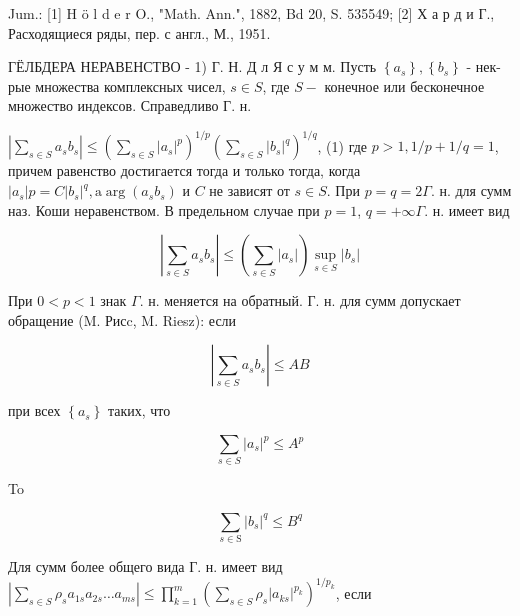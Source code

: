 \documentclass[10pt]{article}
\begin{document}
Jum.: [1] H ö l d e r O., "Math. Ann.", 1882, Bd 20, S. 535549; [2] Х а р д и Г., Расходящиеся ряды, пер. с англ., М., 1951.



ГЁЛБДЕРА НЕРАВЕНСТВО - 1) Г. Н. Д л Я с у м м. Пусть $\left\{a_{s}\right\},\left\{b_{s}\right\}$ - нек-рые множества комплексных чисел, $s \in S$, где $S-$ конечное или бесконечное множество индексов. Справедливо Г. н.



$\left|\sum_{s \in S} a_{s} b_{s}\right| \leqslant\left(\sum_{s \in S}\left|a_{s}\right|^{p}\right)^{1 / p}\left(\sum_{s \in S}\left|b_{s}\right|^{q}\right)^{1 / q}$, (1) где $p>1,1 / p+1 / q=1$, причем равенство достигается тогда и только тогда, когда $\left|a_{s}\right| p=C\left|b_{s}\right|^{q}, \mathrm{a} \arg \left(a_{s} b_{s}\right)$ и $C$ не зависят от $s \in S$. При $p=q=2 \Gamma$. н. для сумм наз. Коши неравенством. В предельном случае при $p=1$, $q=+\infty \Gamma$. н. имеет вид



\[

\left|\sum_{s \in S} a_{s} b_{s}\right| \leqslant\left(\sum_{s \in S}\left|a_{s}\right|\right) \sup _{s \in S}\left|b_{s}\right|

\]



При $0<p<1$ знак $\Gamma$. н. меняется на обратный. Г. н. для сумм допускает обращение (M. Рисc, M. Riesz): если



\[

\left|\sum_{s \in S} a_{s} b_{s}\right| \leqslant A B

\]



при всех $\left\{a_{s}\right\}$ таких, что



\[

\sum_{s \in S}\left|a_{s}\right|^{p} \leqslant A^{p}

\]



To



\[

\sum_{s \in \mathrm{S}}\left|b_{s}\right|^{q} \leqslant B^{q}

\]



Для сумм более общего вида Г. н. имеет вид $\left|\sum_{s \in S} \rho_{s} a_{1 s} a_{2 s} \ldots a_{m s}\right| \leqslant \prod_{k=1}^{m}\left(\sum_{s \in S} \rho_{s}\left|a_{k s}\right|^{p_{k}}\right)^{1 / p_{k}}$, если
\end{document}
